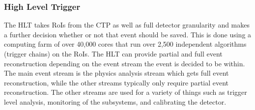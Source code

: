 \subsubsection{High Level Trigger}
The HLT takes RoIs from the CTP as well as full detector granularity and makes a further decision whether or not that event should be saved.  This is done using a computing farm of over 40,000 cores that run over 2,500 independent algorithms (trigger chains) on the RoIs.  The HLT can provide partial and full event reconstruction depending on the event stream the event is decided to be within.  The main event stream is the physics analysis stream which gets full event reconstruction, while the other streams typically only require partial event reconstruction.  The other streams are used for a variety of things such as trigger level analysis, monitoring of the subsystems, and calibrating the detector.














